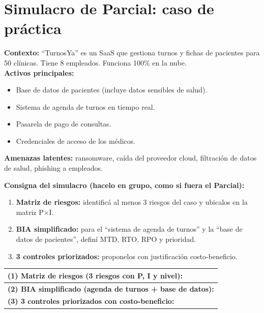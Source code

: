 \documentclass[12pt,a4paper]{article}
\renewcommand{\arraystretch}{1.25}
\begin{document}
\newpage
\section{Simulacro de Parcial: caso de pr\'actica}

\begin{cajaActividad}[title={Caso: ``TurnosYa'' (practic\'a antes del Parcial)}]
\textbf{Contexto:} ``TurnosYa'' es un SaaS que gestiona turnos y fichas de pacientes para 50 cl\'inicas. Tiene 8 empleados. Funciona 100\% en la nube.\\[4pt]
\textbf{Activos principales:}
\begin{itemize}[leftmargin=1.5em]
    \item Base de datos de pacientes (incluye datos sensibles de salud).
    \item Sistema de agenda de turnos en tiempo real.
    \item Pasarela de pago de consultas.
    \item Credenciales de acceso de los m\'edicos.
\end{itemize}
\textbf{Amenazas latentes:} ransomware, ca\'ida del proveedor cloud, filtraci\'on de datos de salud, phishing a empleados.
\end{cajaActividad}

\vspace{8pt}

\noindent\textbf{Consigna del simulacro (hacelo en grupo, como si fuera el Parcial):}

\begin{enumerate}[leftmargin=2em]
    \item \textbf{Matriz de riesgos:} identific\'a al menos 3 riesgos del caso y ubicalos en la matriz P$\times$I.
    \item \textbf{BIA simplificado:} para el ``sistema de agenda de turnos'' y la ``base de datos de pacientes'', defin\'i MTD, RTO, RPO y prioridad.
    \item \textbf{3 controles priorizados:} proponelos con justificaci\'on costo-beneficio.
\end{enumerate}

\vspace{6pt}

\begin{cajaActividad}[title={Tu resoluci\'on del simulacro}]
\renewcommand{\arraystretch}{1.5}
\begin{tabularx}{\textwidth}{|X|}
\hline
\textbf{(1) Matriz de riesgos (3 riesgos con P, I y nivel):} \\[4cm]
\hline
\textbf{(2) BIA simplificado (agenda de turnos + base de datos):} \\[4cm]
\hline
\textbf{(3) 3 controles priorizados con costo-beneficio:} \\[5cm]
\hline
\end{tabularx}
\end{cajaActividad}
\end{document}
